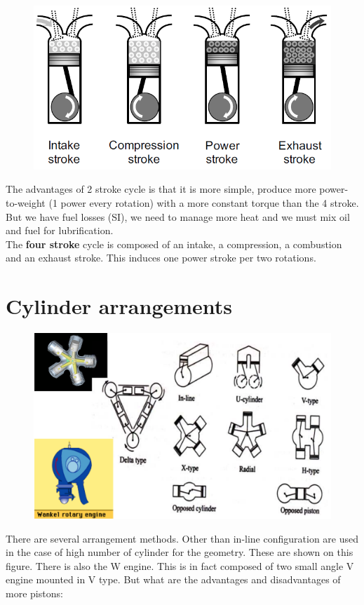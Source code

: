 		\begin{figure}
		\vspace{-5mm}
		\includegraphics[scale=0.33]{ch1/8}
		\label{fig:1.8}
		\end{figure}
		The advantages of 2 stroke cycle is that it is more simple, produce more power-to-weight (1 power every rotation) with a more constant torque than the 4 stroke. But we have fuel losses (SI), we need to manage more heat and we must mix oil and fuel for lubrification. \\
		
		The \textbf{four stroke} cycle is composed of an intake, a compression, a combustion and an exhaust stroke. This induces one power stroke per two rotations.  
		
		\section{Cylinder arrangements}
			\begin{figure}
			\vspace{-5mm}
			\includegraphics[scale=0.25]{ch1/9}
			\end{figure}
			There are several arrangement methods. Other than in-line configuration are used in the case of high number of cylinder for the geometry. These are shown on this figure. There is also the W engine. This is in fact composed of two small angle V engine mounted in V type. But what are the advantages and disadvantages of more pistons:
			
